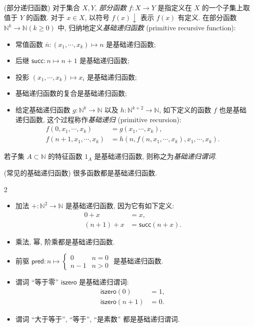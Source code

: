 \begin{definition}
	{(部分递归函数)}
	对于集合 $X,Y$, \emph{部分函数} $f\colon X \to Y$ 是指定义在 $X$ 的一个子集上取值于 $Y$ 的函数. 对于 $x\in X$, 以符号 $f(x)\downarrow$ 表示 $f(x)$ 有定义.
	在部分函数 $\mathbb{N}^k \to \mathbb{N} (k\geq 0)$ 中, 归纳地定义\emph{基础递归函数} (primitive recursive function):
	\begin{itemize}
		\item 常值函数 $\bar n\colon (x_1,\cdots,x_k)\mapsto n$ 是基础递归函数;
		\item 后继 $\mathsf {succ} \colon n\mapsto n+1$ 是基础递归函数;
		\item 投影 $(x_1,\cdots,x_k)\mapsto x_i$ 是基础递归函数;
		\item 基础递归函数的复合是基础递归函数;
		\item 给定基础递归函数 $g\colon \mathbb{N}^k\to \mathbb{N}$ 以及 $h\colon \mathbb{N}^{k+2}\to\mathbb{N}$, 如下定义的函数 $f$ 也是基础递归函数, 这个过程称作\emph{基础递归} (primitive recursion):
		$$
		\begin{aligned}
			f(0,x_1,\cdots,x_k) &= g(x_1,\cdots,x_k),
			\\
			f(n+1,x_1,\cdots,x_k) &= h(n,f(n,x_1,\cdots,x_k),x_1,\cdots,x_k).
		\end{aligned}
		$$
	\end{itemize}
	若子集 $A\subset\mathbb{N}$ 的特征函数 $1_A$ 是基础递归函数, 则称之为\emph{基础递归谓词}.
\end{definition}

\begin{example}
	{(常见的基础递归函数)}
	很多函数都是基础递归函数.
	\begin{multicols}
		{2}
		\begin{itemize}
			\item 加法 $+\colon \mathbb{N}^2\to \mathbb{N}$ 是基础递归函数, 因为它有如下定义:
			$$
			\begin{aligned}
				0+x &= x,
				\\
				(n+1)+x &= \mathsf {succ}(n+x).
			\end{aligned}
			$$
			\item 乘法, 幂, 阶乘都是基础递归函数.
			\item 前驱 $\mathsf {pred}\colon n\mapsto
			\begin{cases}
				0 & n=0\\
				n-1 & n>0
			\end{cases}
			$ 是基础递归函数.
			\item 谓词 ``等于零'' $\mathsf {iszero}$ 是基础递归谓词:
			$$
			\begin{aligned}
				\mathsf{iszero}(0) &= 1,
				\\
				\mathsf{iszero}(n+1) &= 0.
			\end{aligned}
			$$
			\item 谓词 ``大于等于'', ``等于'', ``是素数'' 都是基础递归谓词.
		\end{itemize}
	\end{multicols}
\end{example}

